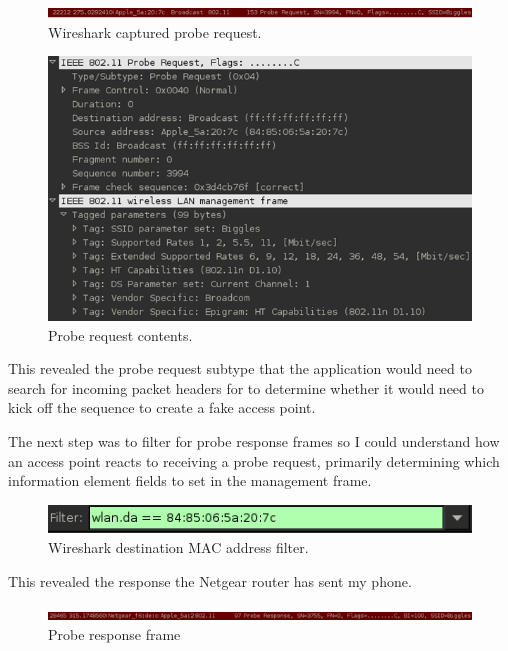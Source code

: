 \begin{figure}[htb!]
\includegraphics[width=\linewidth]{research/80211/figures/bt3.png}
\caption{Wireshark captured probe request.}
\label{research:80211:bt3}
\end{figure}

\begin{figure}[htb!]
\includegraphics[width=\linewidth]{research/80211/figures/bt4.png}
\caption{Probe request contents.}
\label{research:80211:bt4}
\end{figure}

This revealed the probe request subtype that the application would need to search for incoming packet headers for to determine whether it would need to kick off the sequence to create a fake access point.

The next step was to filter for probe response frames so I could understand how an access point reacts to receiving a probe request, primarily determining which information element fields to set in the management frame.

\begin{figure}[htb!]
\includegraphics[width=\linewidth]{research/80211/figures/bt5.png}
\caption{Wireshark destination MAC address filter.}
\label{research:80211:bt5}
\end{figure}

This revealed the response the Netgear router has sent my phone.

\begin{figure}[htb!]
\includegraphics[width=\linewidth]{research/80211/figures/bt6.png}
\caption{Probe response frame}
\label{research:80211:bt6}
\end{figure}


